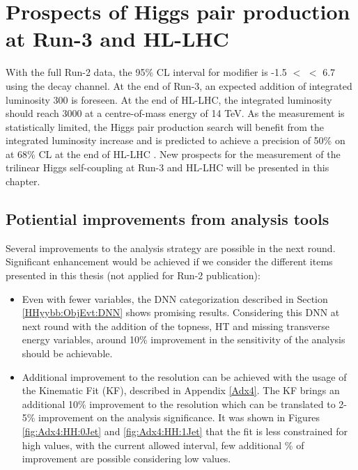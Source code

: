 \newpage
\chapter{Prospects of Higgs pair production at Run-3 and HL-LHC}
\label{HL-LHC}

With the full Run-2 data, the 95\% CL interval for \kl modifier is -1.5 $<$ \kl $<$ 6.7 using the \HHyybb decay channel. At the end of Run-3, an expected addition of integrated luminosity  300 \ifb is foreseen. At the end of HL-LHC, the integrated luminosity should reach 3000 \ifb at a centre-of-mass energy of 14 TeV. As the measurement is statistically limited, the Higgs pair production search will benefit from the integrated luminosity increase and is predicted to achieve a precision of 50\% on \kl at 68\% CL at the end of HL-LHC \cite{Europ}. New prospects for the measurement of the trilinear Higgs self-coupling at Run-3 and HL-LHC will be presented in this chapter. 

\section{Potiential \HHyybb improvements from analysis tools}
\label{HL-LHC:Run-3}

Several improvements to the \HHyybb analysis strategy are possible in the next round. Significant enhancement would be achieved if we consider the different items presented in this thesis (not applied for Run-2 publication):
\begin{itemize}
    \item Even with fewer variables, the DNN categorization described in Section \ref{HHyybb:ObjEvt:DNN} shows promising results. Considering this DNN at next round with the addition of the topness, HT and missing transverse energy variables, around 10\% improvement in the sensitivity of the analysis should be achievable. 
    \item Additional improvement to the \mbb resolution can be achieved with the usage of the Kinematic Fit (KF), described in Appendix \ref{Adx4}. The KF brings an additional 10\% improvement to the \mbb resolution which can be translated to 2-5\% improvement on the analysis significance. It was shown in Figures \ref{fig:Adx4:HH:0Jet} and \ref{fig:Adx4:HH:1Jet} that the fit is less constrained for high \kl values, with the current allowed \kl interval, few additional \% of improvement are possible considering low \kl values.
\end{itemize}

